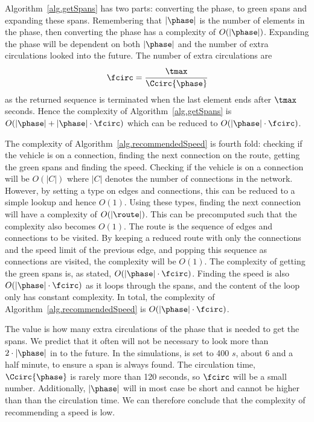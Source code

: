 Algorithm~\ref{alg.getSpans} has two parts: converting the phase, \phase to green spans and expanding these spans.
Remembering that $|\phase|$ is the number of elements in the phase, then converting the phase has a complexity of $O(|\phase|)$.
Expanding the phase will be dependent on both $|\phase|$ and the number of extra circulations looked into the future. 
The number of extra circulations are 
\[\fcirc = \cfrac{\tmax}{\Ccirc{\phase}}\]
as the returned sequence is terminated when the last element ends after $\tmax$ seconds.
Hence the complexity of Algorithm~\ref{alg.getSpans} is  $O(|\phase|+ |\phase|\cdot \fcirc)$ which can be reduced to $O(|\phase|\cdot \fcirc)$.

The complexity of Algorithm~\ref{alg.recommendedSpeed} is fourth fold: checking if the vehicle is on a connection, finding the next connection on the route, getting the green spans and finding the speed.
Checking if the vehicle is on a connection will be $O(|C|)$ where $|C|$ denotes the number of connections in the network.
However, by setting a type on edges and connections, this can be reduced to a simple lookup and hence $O(1)$.
Using these types, finding the next connection will have a complexity of $O(|\route|)$.
This can be precomputed such that the complexity also becomes $O(1)$.
The route is the sequence of edges and connections to be visited.
By keeping a reduced route with only the connections and the speed limit of the previous edge, and popping this sequence as connections are visited, the complexity will be $O(1)$.
The complexity of getting the green spans is, as stated, $O(|\phase|\cdot \fcirc)$.
Finding the speed is also $O(|\phase|\cdot \fcirc)$ as it loops through the spans, and the content of the loop only has constant complexity.
In total, the complexity of Algorithm~\ref{alg.recommendedSpeed} is $O(|\phase|\cdot \fcirc)$.

The value \fcirc is how many extra circulations of the phase that is needed to get the spans. 
We predict that it often will not be necessary to look more than $2\cdot |\phase|$ in to the future.
In the simulations, \tmax is set to 400 $s$, about 6 and a half minute, to ensure a span is always found.
The circulation time, $\Ccirc{\phase}$ is rarely more than 120 seconds, so $\fcirc$ will be a small number.
Additionally, $|\phase|$ will in most case be short and cannot be higher than than the circulation time.
We can therefore conclude that the complexity of recommending a speed is low.

